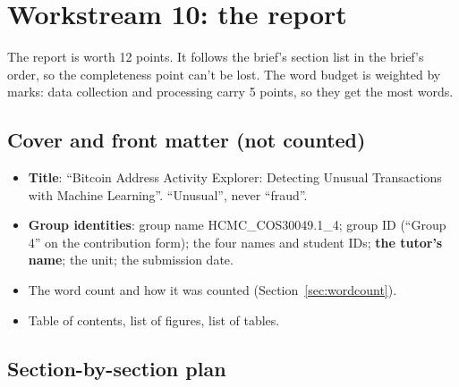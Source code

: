 \section{Workstream 10: the report}
\label{sec:report}

The report is worth 12 points. It follows the brief's section list in the brief's order, so the
completeness point can't be lost. The word budget is weighted by marks: data collection and
processing carry 5 points, so they get the most words.

\subsection{Cover and front matter (not counted)}

\begin{itemize}
  \item \textbf{Title}: ``Bitcoin Address Activity Explorer: Detecting Unusual Transactions with
    Machine Learning''. ``Unusual'', never ``fraud''.
  \item \textbf{Group identities}: group name HCMC\_COS30049.1\_4; group ID (``Group 4'' on the
    contribution form); the four names and student IDs; \textbf{the tutor's name}; the unit;
    the submission date.
  \item The word count and how it was counted (Section~\ref{sec:wordcount}).
  \item Table of contents, list of figures, list of tables.
\end{itemize}

\subsection{Section-by-section plan}

